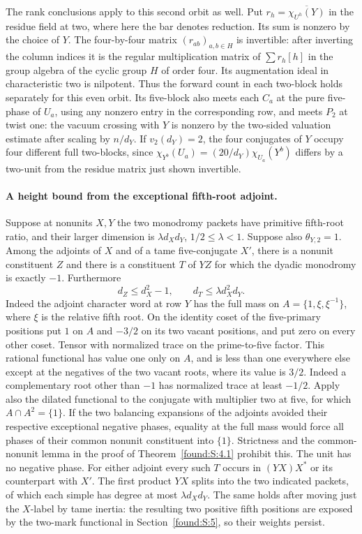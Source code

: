 \documentclass[11pt,a4paper]{article}
\numberwithin{equation}{section}
\theoremstyle{remark}
\begin{document}
The rank conclusions apply to this second orbit as well.
Put $r_h=\overline{\chi_{U^h}(Y)}$ in the residue field at two,
where here the bar denotes reduction. Its sum is nonzero by the
choice of $Y$. The four-by-four matrix $(r_{ab})_{a,b\in H}$
is invertible: after inverting the column indices it is the regular
multiplication matrix of $\sum r_h[h]$ in the group algebra of
the cyclic group $H$ of order four. Its augmentation ideal in
characteristic two is nilpotent. Thus the forward count in each
two-block holds separately for this even orbit. Its five-block
also meets each $C_a$ at the pure five-phase of $U_a$, using any
nonzero entry in the corresponding row, and meets $P_2$ at twist
one: the vacuum crossing with $Y$ is nonzero by the two-sided
valuation estimate after scaling by $n/d_Y$. If $v_2(d_Y)=2$,
the four conjugates of $Y$ occupy four different full two-blocks,
since $\chi_{Y^b}(U_a)=(20/d_Y)\chi_{U_a}(Y^b)$ differs by a
two-unit from the residue matrix just shown invertible.

\paragraph{A height bound from the exceptional fifth-root adjoint.}
Suppose at nonunits $X,Y$ the two monodromy packets have primitive
fifth-root ratio, and their larger dimension is
$\lambda d_Xd_Y$, $1/2\le\lambda<1$. Suppose also
$\theta_{Y,2}=1$. Among the adjoints of $X$ and of a tame
five-conjugate $X'$, there is a nonunit constituent $Z$ and there
is a constituent $T$ of $YZ$ for which the dyadic monodromy is
exactly $-1$. Furthermore
\[
                d_Z\le d_X^2-1,\qquad
                d_T\le\lambda d_X^2d_Y .
\]
Indeed the adjoint character word at row $Y$ has the full mass on
$A=\{1,\xi,\xi^{-1}\}$, where $\xi$ is the relative fifth root.
On the identity coset of the five-primary positions put $1$ on
$A$ and $-3/2$ on its two vacant positions, and put zero on every
other coset. Tensor with normalized trace on the prime-to-five
factor. This rational functional has value one only on $A$, and
is less than one everywhere else except at the negatives of the
two vacant roots, where its value is $3/2$. Indeed a complementary
root other than $-1$ has normalized trace at least $-1/2$.
Apply also the dilated functional to the conjugate with multiplier
two at five, for which $A\cap A^2=\{1\}$. If the two balancing
expansions of the adjoints avoided their respective exceptional
negative phases, equality at the full mass would force all phases
of their common nonunit constituent into $\{1\}$. Strictness and
the common-nonunit lemma in the proof of Theorem~\ref{found:S:4.1} prohibit
this. The unit has no negative phase. For either adjoint every such
$T$ occurs in $(YX)X^*$ or its counterpart with $X'$. The first
product $YX$ splits into the two indicated packets, of which each
simple has degree at most $\lambda d_Xd_Y$. The same holds after
moving just the $X$-label by tame inertia: the resulting two
positive fifth positions are exposed by the two-mark functional in Section~\ref{found:S:5}, so their weights persist.
\end{document}
